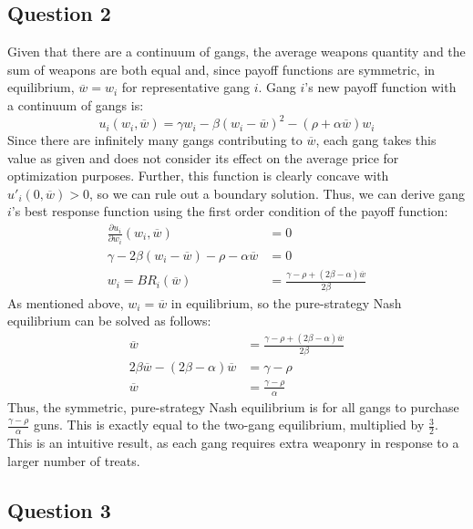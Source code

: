 \documentclass{article}
\newcommand{\olw}{\overline{w}}
\begin{document}
\subsection*{Question 2}
Given that there are a continuum of gangs, the average weapons quantity and the sum of weapons are both equal and, since payoff functions are symmetric, in equilibrium, $\olw=w_i$ for representative gang $i$. Gang $i$'s new payoff function with a continuum of gangs is:
\[
	u_i(w_i,\olw) = \gamma w_i - \beta(w_i - \olw)^2 - (\rho + \alpha\olw)w_i
\]
Since there are infinitely many gangs contributing to $\olw$, each gang takes this value as given and does not consider its effect on the average price for optimization purposes. Further, this function is clearly concave with ${u'_i(0,\olw)>0}$, so we can rule out a boundary solution. Thus, we can derive gang $i$'s best response function using the first order condition of the payoff function:
\begin{align*}
	\frac{\partial u_i}{\partial w_i}(w_i,\olw) & = 0	\\
	\gamma - 2\beta(w_i - \olw) - \rho - \alpha\olw &= 0	\\
	w_i = BR_i(\olw) &= \frac{\gamma - \rho + (2\beta - \alpha)\olw}{2\beta}
\end{align*}
As mentioned above, $w_i=\olw$ in equilibrium, so the pure-strategy Nash equilibrium can be solved as follows:
\begin{align*}
	\olw &= \frac{\gamma - \rho + (2\beta - \alpha)\olw}{2\beta}	\\
	2\beta\olw -(2\beta-\alpha)\olw &= \gamma - \rho 	\\
	\olw &= \frac{\gamma - \rho}{\alpha}
\end{align*}
Thus, the symmetric, pure-strategy Nash equilibrium is for all gangs to purchase $\frac{\gamma - \rho}{\alpha}$ guns. This is exactly equal to the two-gang equilibrium, multiplied by $\frac{3}{2}$. This is an intuitive result, as each gang requires extra weaponry in response to a larger number of treats.

\pagebreak
\subsection*{Question 3}
\end{document}
